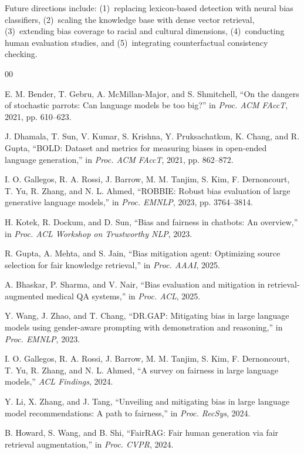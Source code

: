 \documentclass[conference]{IEEEtran}
\begin{document}
Future directions include: (1)~replacing lexicon-based detection with neural bias classifiers, (2)~scaling the knowledge base with dense vector retrieval, (3)~extending bias coverage to racial and cultural dimensions, (4)~conducting human evaluation studies, and (5)~integrating counterfactual consistency checking.

\begin{thebibliography}{00}

E. M. Bender, T. Gebru, A. McMillan-Major, and S. Shmitchell,
``On the dangers of stochastic parrots: Can language models be too big?''
in \textit{Proc. ACM FAccT}, 2021, pp. 610--623.

J. Dhamala, T. Sun, V. Kumar, S. Krishna, Y. Pruksachatkun, K. Chang, and R. Gupta,
``BOLD: Dataset and metrics for measuring biases in open-ended language generation,''
in \textit{Proc. ACM FAccT}, 2021, pp. 862--872.

I. O. Gallegos, R. A. Rossi, J. Barrow, M. M. Tanjim, S. Kim, F. Dernoncourt, T. Yu, R. Zhang, and N. L. Ahmed,
``ROBBIE: Robust bias evaluation of large generative language models,''
in \textit{Proc. EMNLP}, 2023, pp. 3764--3814.

H. Kotek, R. Dockum, and D. Sun,
``Bias and fairness in chatbots: An overview,''
in \textit{Proc. ACL Workshop on Trustworthy NLP}, 2023.

R. Gupta, A. Mehta, and S. Jain,
``Bias mitigation agent: Optimizing source selection for fair knowledge retrieval,''
in \textit{Proc. AAAI}, 2025.

A. Bhaskar, P. Sharma, and V. Nair,
``Bias evaluation and mitigation in retrieval-augmented medical QA systems,''
in \textit{Proc. ACL}, 2025.

Y. Wang, J. Zhao, and T. Chang,
``DR.GAP: Mitigating bias in large language models using gender-aware prompting with demonstration and reasoning,''
in \textit{Proc. EMNLP}, 2023.

I. O. Gallegos, R. A. Rossi, J. Barrow, M. M. Tanjim, S. Kim, F. Dernoncourt, T. Yu, R. Zhang, and N. L. Ahmed,
``A survey on fairness in large language models,''
\textit{ACL Findings}, 2024.

Y. Li, X. Zhang, and J. Tang,
``Unveiling and mitigating bias in large language model recommendations: A path to fairness,''
in \textit{Proc. RecSys}, 2024.

B. Howard, S. Wang, and B. Shi,
``FairRAG: Fair human generation via fair retrieval augmentation,''
in \textit{Proc. CVPR}, 2024.

\end{thebibliography}
\end{document}
